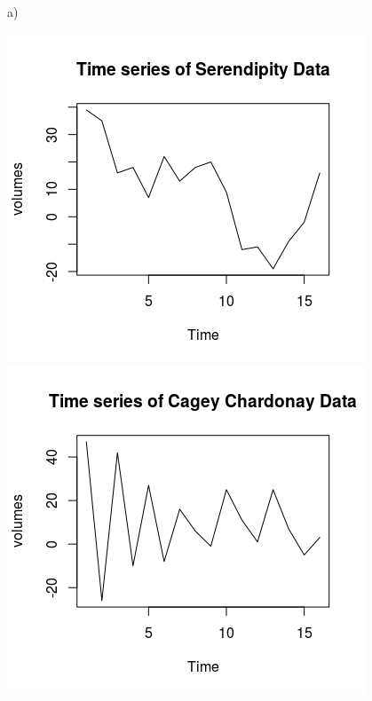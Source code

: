 \documentclass[11pt]{article}
\begin{document}
\section{}
a)
\begin{center}
	\includegraphics[scale=1]{plt5a1}
	\includegraphics[scale=1]{plt5a2}
\end{center}
\end{document}
